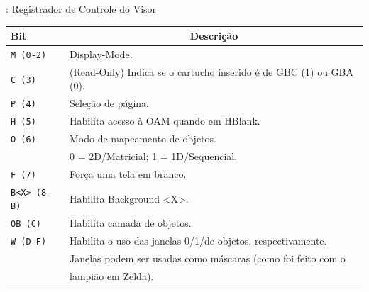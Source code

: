\documentclass{beamer}
\begin{document}
\begin{darkframes}
\begin{frame}{\secname: Registrador de Controle do Visor}
        \scriptsize{\begin{center}
            \begin{tabular}{|l|l|}
                \hline
                Bit & \multicolumn{1}{|c|}{Descrição} \\\hline
                \texttt{M (0-2)} & Display-Mode. \\\hline
                \texttt{C (3)} & (Read-Only) Indica se o cartucho inserido é de GBC (1) ou GBA (0). \\\hline
                \texttt{P (4)} & Seleção de página. \\\hline
                \texttt{H (5)} & Habilita acesso à OAM quando em HBlank. \\\hline
                \texttt{O (6)} & Modo de mapeamento de objetos.\\
                               & 0 = 2D/Matricial; 1 = 1D/Sequencial. \\\hline
                \texttt{F (7)} & Força uma tela em branco. \\\hline
                \texttt{B<X> (8-B)} & Habilita Background <X>. \\\hline
                \texttt{OB (C)} & Habilita camada de objetos. \\\hline
                \texttt{W (D-F)} & Habilita o uso das janelas 0/1/de objetos, respectivamente. \\
                                 & Janelas podem ser usadas como máscaras (como foi feito com o \\
                                 & lampião em Zelda). \\\hline
            \end{tabular}
        \end{center}}
    \end{frame}

\end{darkframes}
\end{document}
